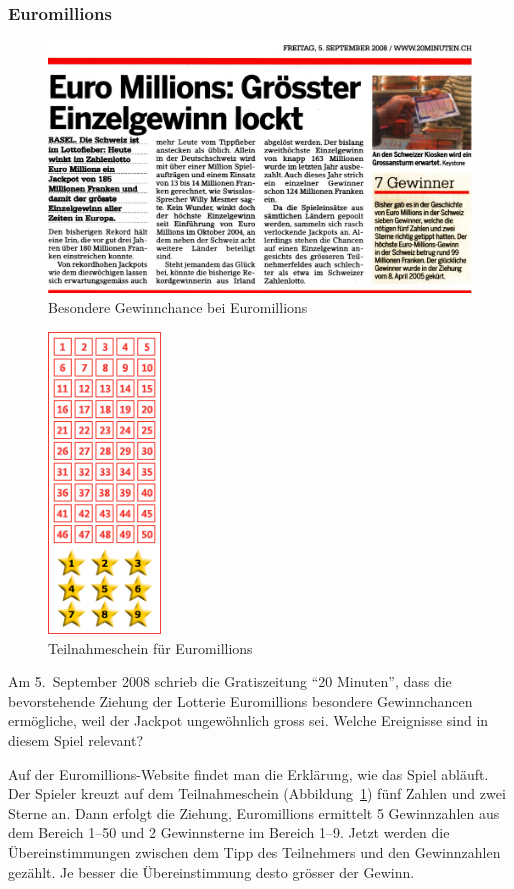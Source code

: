 \subsubsection{Euromillions}
\begin{figure}
\includegraphics[width=\hsize]{graphics/euromillions}
\caption{Besondere Gewinnchance bei Euromillions}
\end{figure}
\begin{figure}
\begin{center}
\includegraphics[height=8cm]{graphics/euromillionsschein}
\end{center}
\caption{Teilnahmeschein für Euromillions\label{euromillionsschein}}
\end{figure}
Am 5.~September 2008 schrieb die Gratiszeitung ``20 Minuten'', dass die
bevorstehende Ziehung der Lotterie Euromillions besondere Gewinnchancen 
ermögliche, weil der Jackpot ungewöhnlich gross sei.
Welche Ereignisse
sind in diesem Spiel relevant?

Auf der Euromillions-Website findet man die Erklärung, wie das Spiel abläuft.
Der Spieler kreuzt auf dem Teilnahmeschein (Abbildung~\ref{euromillionsschein})
fünf Zahlen und zwei Sterne an.
Dann erfolgt die Ziehung, Euromillions ermittelt
5 Gewinnzahlen aus dem Bereich 1--50 und 2 Gewinnsterne im Bereich 1--9.
Jetzt werden die Übereinstimmungen zwischen dem Tipp des Teilnehmers und den
Gewinnzahlen gezählt.
Je besser die Übereinstimmung desto grösser der Gewinn.

